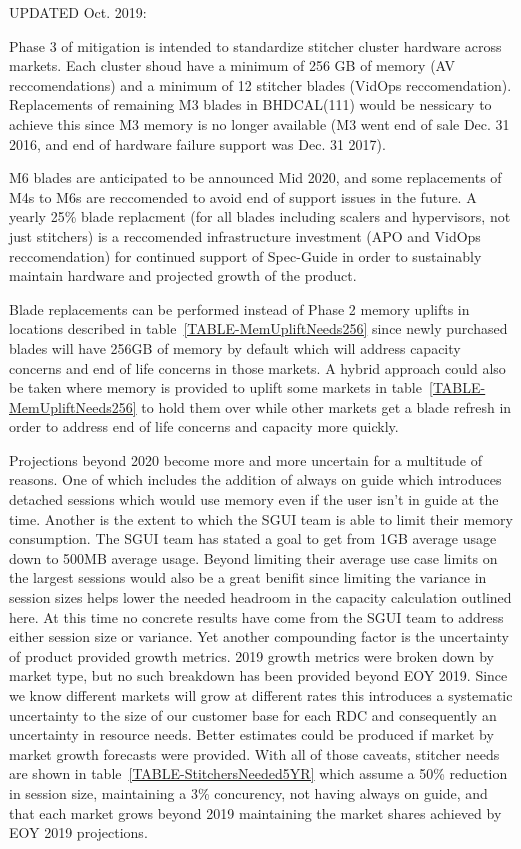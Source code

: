 \documentclass{article}
\begin{document}
UPDATED Oct. 2019:

Phase 3 of mitigation is intended to standardize stitcher cluster hardware across markets. Each cluster shoud have a minimum of 256 GB of memory (AV reccomendations) and a minimum of 12 stitcher blades (VidOps reccomendation). Replacements of remaining M3 blades in BHDCAL(111) would be nessicary to achieve this since M3 memory is no longer available (M3 went end of sale Dec. 31 2016, and end of hardware failure support was Dec. 31 2017). 

M6 blades are anticipated to be announced Mid 2020, and some replacements of M4s to M6s are reccomended to avoid end of support issues in the future. A yearly 25\% blade replacment (for all blades including scalers and hypervisors, not just stitchers) is a reccomended infrastructure investment (APO and VidOps reccomendation) for continued support of Spec-Guide in order to sustainably maintain hardware and projected growth of the product. 

Blade replacements can be performed instead of Phase 2 memory uplifts in locations described in table~\ref{TABLE-MemUpliftNeeds256} since newly purchased blades will have 256GB of memory by default which will address capacity concerns and end of life concerns in those markets. A hybrid approach could also be taken where memory is provided to uplift some markets in table~\ref{TABLE-MemUpliftNeeds256} to hold them over while other markets get a blade refresh in order to address end of life concerns and capacity more quickly. 

Projections beyond 2020 become more and more uncertain for a multitude of reasons. One of which includes the addition of always on guide which introduces detached sessions which would use memory even if the user isn't in guide at the time. Another is the extent to which the SGUI team is able to limit their memory consumption. The SGUI team has stated a goal to get from 1GB average usage down to 500MB average usage. Beyond limiting their average use case limits on the largest sessions would also be a great benifit since limiting the variance in session sizes helps lower the needed headroom in the capacity calculation outlined here. At this time no concrete results have come from the SGUI team to address either session size or variance. Yet another compounding factor is the uncertainty of product provided growth metrics. 2019 growth metrics were broken down by market type, but no such breakdown has been provided beyond EOY 2019. Since we know different markets will grow at different rates this introduces a systematic uncertainty to the size of our customer base for each RDC and consequently an uncertainty in resource needs. Better estimates could be produced if market by market growth forecasts were provided. With all of those caveats, stitcher needs are shown in table~\ref{TABLE-StitchersNeeded5YR} which assume a 50\% reduction in session size, maintaining a 3\% concurency, not having always on guide, and that each market grows beyond 2019 maintaining the market shares achieved by EOY 2019 projections. 
\end{document}
